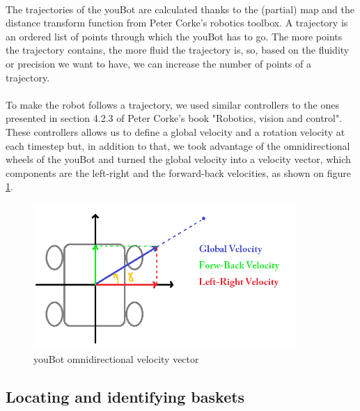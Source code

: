 \documentclass[12pt,a4paper]{article}
\begin{document}
\paragraph{}
The trajectories of the youBot are calculated thanks to the (partial) map and the distance transform function from Peter Corke's robotics toolbox\cite{CorkeRTB}. A trajectory is an ordered list of points through which the youBot has to go. The more points the trajectory contains, the more fluid the trajectory is, so, based on the fluidity or precision we want to have, we can increase the number of points of a trajectory. 

\paragraph{}
To make the robot follows a trajectory, we used similar controllers to the ones presented in section 4.2.3 of Peter Corke's book "Robotics, vision and control"\cite{CorkeBook}. These controllers allows us to define a global velocity and a rotation velocity at each timestep but, in addition to that, we took advantage of the omnidirectional wheels of the youBot and turned the global velocity into a velocity vector, which components are the left-right and the forward-back velocities, as shown on figure \ref{velocities}.

\begin{figure}[h]
	\centering
		\includegraphics[width=10cm]{velocities.png}
	\caption{youBot omnidirectional velocity vector}
	\label{velocities}
\end{figure}

\FloatBarrier

\subsection{Locating and identifying baskets}

\paragraph{}
\end{document}
